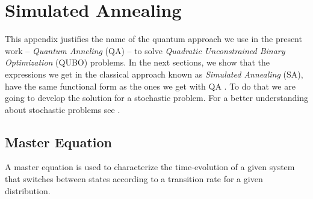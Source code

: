 
\chapter{Simulated Annealing} %

This appendix justifies the name of the quantum approach we use in the present work -- \textit{Quantum Anneling} (QA) -- to solve \textit{Quadratic Unconstrained Binary Optimization} (QUBO) problems. In the next sections, we show that the expressions we get in the classical approach known as \textit{Simulated Annealing} (SA), have the same functional form as the ones we get with QA \cite{Kadowaki1998QuantumModel}. To do that we are going to develop the solution for a stochastic problem. For a better understanding about stochastic problems see \cite{Schneider2006StochasticOptimization}. 
\label{AppendixB} %
\section{Master Equation}
A master equation is used to characterize the time-evolution of a given system that switches between states according to a transition rate for a given distribution.
